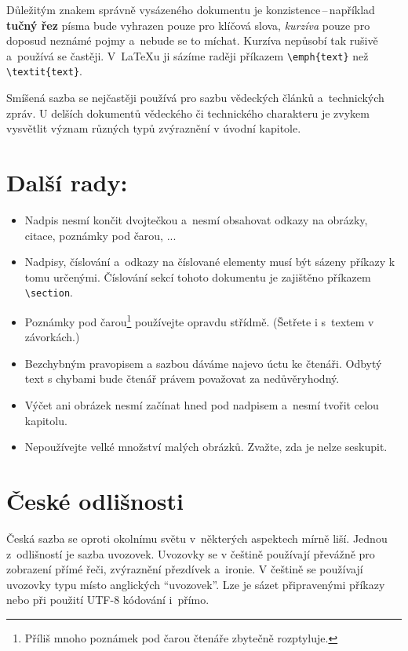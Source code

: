 \documentclass[a4paper, 10pt, twocolumn]{article}
\begin{document}
    	Důležitým znakem správně vysázeného dokumentu je konzistence\,--\,například \textbf{tučný řez} písma bude vyhrazen pouze pro klíčová slova, \emph{kurzíva} pouze pro doposud neznámé pojmy a~nebude se to míchat.
        Kurzíva nepůsobí tak rušivě a~používá se častěji.
        V~{\LaTeX}u ji sázíme raději příkazem \verb|\emph{text}| než \verb|\textit{text}|.
    
    	Smíšená sazba se nejčastěji používá pro sazbu vědeckých článků a~technických zpráv.
        U delších dokumentů vědeckého či technického charakteru je zvykem vysvětlit význam různých typů zvýraznění v úvodní kapitole.

	\section{Další rady:}
	\label{sec:3}

    	\begin{itemize}
    	    \item Nadpis nesmí končit dvojtečkou a~nesmí obsahovat odkazy na obrázky, citace, poznámky pod čarou, ...
    	    \item Nadpisy, číslování a~odkazy na číslované elementy musí být sázeny příkazy k tomu určenými. Číslování sekcí tohoto dokumentu je zajištěno příkazem \verb|\section|.
    	    \item Poznámky pod čarou\footnote{Příliš mnoho poznámek pod čarou čtenáře zbytečně rozptyluje.} používejte opravdu střídmě. (Šetřete i s~textem v závorkách.)
    	    \item Bezchybným pravopisem a sazbou dáváme najevo úctu ke čtenáři. Odbytý text s chybami bude čtenář právem považovat za nedůvěryhodný.
            \item Výčet ani obrázek nesmí začínat hned pod nadpisem a~nesmí tvořit celou kapitolu.
            \item Nepoužívejte velké množství malých obrázků. Zvažte, zda je nelze seskupit.
        \end{itemize}
        
    \section{České odlišnosti}
    \label{sec:4}
    
    Česká sazba se oproti okolnímu světu v~některých aspektech mírně liší.
    Jednou z~odlišností je sazba uvozovek.
    Uvozovky se v češtině používají převážně pro zobrazení přímé řeči, zvýraznění přezdívek a~ironie.
    V češtině se používají uvozovky typu  místo anglických ``uvozovek''.
    Lze je sázet připravenými příkazy nebo při použití UTF-8 kódování i~přímo.
    
\end{document}
